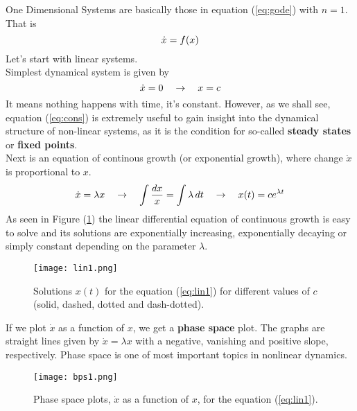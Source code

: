 One Dimensional Systems are basically those in equation (\ref{eq:gode}) with $n=1$.
That is 
\begin{equation}{\label{eq:1d}}
  \dot{x}=f(x)
\end{equation} 
Let's start with linear systems.\\
Simplest dynamical system is given by 
\begin{equation}{\label{eq:cons}}
  \dot{x}=0 \quad \rightarrow \quad x=c 
\end{equation}
It means nothing happens with time, it's constant.
However, as we shall see, equation (\ref{eq:cons}) is extremely useful to gain insight into the dynamical structure of non-linear systems, as it is the condition for so-called {\textbf{steady states}} or {\textbf{fixed points}}.\\
Next is an equation of continous growth (or exponential growth), where change $\dot{x}$ is proportional to $x$.
\begin{equation}{\label{eq:lin1}}
  \dot{x}=\lambda x \quad \rightarrow \quad \int \frac{dx}{x} = \int \lambda \mathop{dt} \quad \rightarrow\quad x(t)= ce^{\lambda t}
\end{equation} 
As seen in Figure (\ref{fig:lin1}) the linear differential equation of continuous growth is easy to solve and its solutions are exponentially increasing, exponentially decaying or simply constant depending on the parameter $\lambda$.
\begin{figure}[h!]
  \centering
  \texttt{[image: lin1.png]}
  \caption{Solutions $x(t)$ for the equation (\ref{eq:lin1}) for different values of $c$ (solid, dashed, dotted and dash-dotted).}
  \label{fig:lin1}
\end{figure}
If we plot $\dot{x}$ as a function of $x$, we get a {\textbf{phase space}} plot.
The graphs are straight lines given by $\dot{x}=\lambda x$ with a negative, vanishing and positive slope, respectively.
Phase space is one of most important topics in nonlinear dynamics.
\begin{figure}[h!]
  \centering
  \texttt{[image: bps1.png]}
  \caption{Phase space plots, $\dot{x}$ as a function of $x$, for the equation (\ref{eq:lin1}).}
  \label{fig:bps1}
\end{figure}
